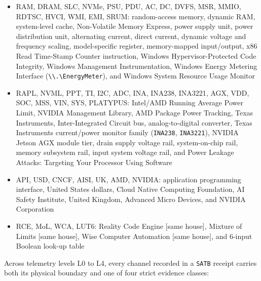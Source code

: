 \documentclass[10pt,letterpaper]{article}
\begin{document}
\begin{itemize}
  arithmetic logic unit, instruction set architecture, instructions per
  cycle, process identifier, user identifier, group identifier,
  operating system, virtual machine, embedded controller, gigabytes,
  Intel Tiger Lake mobile architecture, and NVIDIA GeForce RTX discrete
  GPU family
\item
  RAM, DRAM, SLC, NVMe, PSU, PDU, AC, DC, DVFS, MSR, MMIO, RDTSC, HVCI,
  WMI, EMI, SRUM: random-access memory, dynamic RAM, system-level cache,
  Non-Volatile Memory Express, power supply unit, power distribution
  unit, alternating current, direct current, dynamic voltage and
  frequency scaling, model-specific register, memory-mapped
  input/output, x86 Read Time-Stamp Counter instruction, Windows
  Hypervisor-Protected Code Integrity, Windows Management
  Instrumentation, Windows Energy Metering Interface
  (\texttt{\textbackslash{}\textbackslash{}.\textbackslash{}EnergyMeter}),
  and Windows System Resource Usage Monitor
\item
  RAPL, NVML, PPT, TI, I2C, ADC, INA, INA238, INA3221, AGX, VDD, SOC,
  MSS, VIN, SYS, PLATYPUS: Intel/AMD Running Average Power Limit, NVIDIA
  Management Library, AMD Package Power Tracking, Texas Instruments,
  Inter-Integrated Circuit bus, analog-to-digital converter, Texas
  Instruments current/power monitor family (\texttt{INA238},
  \texttt{INA3221}), NVIDIA Jetson AGX module tier, drain supply voltage
  rail, system-on-chip rail, memory subsystem rail, input system voltage
  rail, and Power Leakage Attacks: Targeting Your Processor Using
  Software
\item
  API, USD, CNCF, AISI, UK, AMD, NVIDIA: application programming
  interface, United States dollars, Cloud Native Computing Foundation,
  AI Safety Institute, United Kingdom, Advanced Micro Devices, and
  NVIDIA Corporation
\item
  RCE, MoL, WCA, LUT6: Reality Code Engine {[}same house{]}, Mixture of
  Limits {[}same house{]}, Wise Computer Automation {[}same house{]},
  and 6-input Boolean look-up table
\end{itemize}

Across telemetry levels L0 to L4, every channel recorded in a
\texttt{SATB} receipt carries both its physical boundary and one of four
strict evidence classes:
\end{document}
